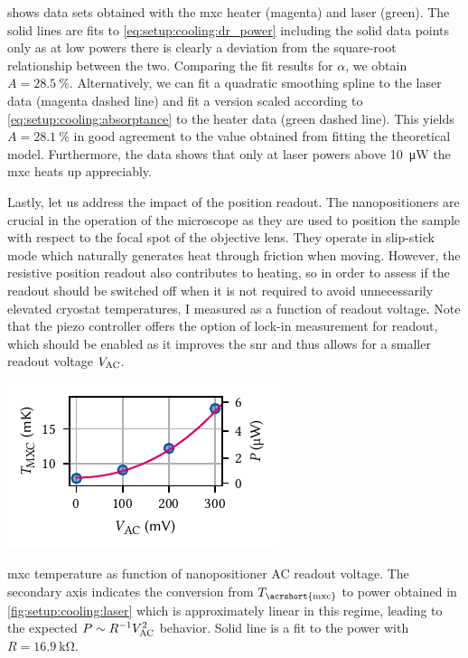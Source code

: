  shows data sets obtained with the \gls{mxc} heater (magenta) and laser (green).
The solid lines are fits to \cref{eq:setup:cooling:dr_power} including the solid data points only as at low powers there is clearly a deviation from the square-root relationship between the two.
Comparing the fit results for $\alpha$, we obtain $A = \qty{28.5}{\percent}$.
Alternatively, we can fit a quadratic smoothing spline to the laser data (magenta dashed line) and fit a version scaled according to \cref{eq:setup:cooling:absorptance} to the heater data (green dashed line).
This yields $A = \qty{28.1}{\percent}$ in good agreement to the value obtained from fitting the theoretical model.
Furthermore, the data shows that only at laser powers above \qty{10}{\micro\watt} the \gls{mxc} heats up appreciably.

Lastly, let us address the impact of the \positioner position readout.
The nanopositioners are crucial in the operation of the microscope as they are used to position the sample with respect to the focal spot of the objective lens.
They operate in slip-stick mode which naturally generates heat through friction when moving.
However, the resistive position readout also contributes to heating, so in order to assess if the readout should be switched off when it is not required to avoid unnecessarily elevated cryostat temperatures, I measured \Tmxc as a function of readout voltage.
Note that the \positionercontroller piezo controller offers the option of lock-in measurement for readout, which should be enabled as it improves the \gls{snr} and thus allows for a smaller readout voltage $V_{\mathrm{AC}}$.

\begin{marginfigure}
    \centering
    \includegraphics{img/pdf/setup/anc_readout_heating}
    \caption[]{
        \Acrlong{mxc} temperature as function of nanopositioner AC readout voltage.
        The secondary axis indicates the conversion from $T_{\mr{\acrshort{mxc}}}$ to power obtained in \cref{fig:setup:cooling:laser} which is approximately linear in this regime, leading to the expected $P\sim R^{-1} V_{\mathrm{AC}}^2$ behavior.
        Solid line is a fit to the power with $R=\qty{16.9}{\kilo\ohm}$.
    }
    \label{fig:setup:cooling:anc}
\end{marginfigure}

